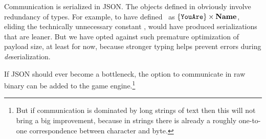 
Communication is serialized in JSON\@. The objects defined
in  obviously involve redundancy of types. For
example, to have defined \youarevalset\ as
$\{ \texttt{YouAre} \} \times \textbf{Name} $, eliding the technically
unnecessary constant \charnametg, would have produced serializations
that are leaner. But we have opted against such premature optimization
of payload size, at least for now, because stronger typing helps
prevent errors during {\em de}serialization.


If JSON should ever become a bottleneck, the option to communicate in
raw binary can be added to the game engine.\footnote{But if
communication is dominated by long strings of text then this will not
bring a big improvement, because in strings there is already a roughly
one-to-one correspondence between character and byte.}

